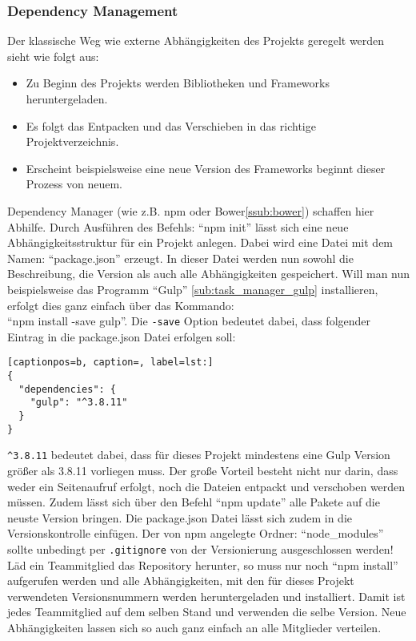 		\subsubsection{Dependency Management} %
		\label{ssub:dependency_management}
			Der klassische Weg wie externe Abhängigkeiten des Projekts geregelt werden sieht wie folgt aus:
			\begin{itemize}
				\item Zu Beginn des Projekts werden Bibliotheken und Frameworks heruntergeladen.
				\item Es folgt das Entpacken und das Verschieben in das richtige Projektverzeichnis.
				\item Erscheint beispielsweise eine neue Version des Frameworks beginnt dieser Prozess von neuem.
			\end{itemize}

			Dependency Manager (wie z.B. npm oder Bower\ref{ssub:bower}) schaffen hier Abhilfe. Durch Ausführen des Befehls: "`npm init"' lässt sich eine neue Abhängigkeitsstruktur für ein Projekt anlegen. Dabei wird eine Datei mit dem Namen: "`package.json"' erzeugt. In dieser Datei werden nun sowohl die Beschreibung, die Version als auch alle Abhängigkeiten gespeichert. Will man nun beispielsweise das Programm "`Gulp"' \ref{sub:task_manager_gulp} installieren, erfolgt dies ganz einfach über das Kommando:\\
			"`npm install -save gulp"'. Die \texttt{-save} Option bedeutet dabei, dass folgender Eintrag in die package.json Datei erfolgen soll:

			\begin{lstlisting}[captionpos=b, caption=, label=lst:]
{
  "dependencies": {
    "gulp": "^3.8.11"
  }
}
			\end{lstlisting}

			\texttt{\textasciicircum 3.8.11} bedeutet dabei, dass für dieses Projekt mindestens eine Gulp Version größer als 3.8.11 vorliegen muss. Der große Vorteil besteht nicht nur darin, dass weder ein Seitenaufruf erfolgt, noch die Dateien entpackt und verschoben werden müssen. Zudem lässt sich über den Befehl "`npm update"' alle Pakete auf die neuste Version bringen. Die package.json Datei lässt sich zudem in die Versionskontrolle einfügen. Der von npm angelegte Ordner: "`node\_modules"' sollte unbedingt per \texttt{.gitignore} von der Versionierung ausgeschlossen werden! Läd ein Teammitglied das Repository herunter, so muss nur noch "`npm install"' aufgerufen werden und alle Abhängigkeiten, mit den für dieses Projekt verwendeten Versionsnummern werden heruntergeladen und installiert. Damit ist jedes Teammitglied auf dem selben Stand und verwenden die selbe Version. Neue Abhängigkeiten lassen sich so auch ganz einfach an alle Mitglieder verteilen.			
			

